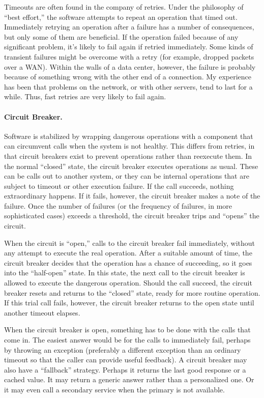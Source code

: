 Timeouts are often found in the company of retries. Under the philosophy of “best effort,” the software attempts to repeat an operation that timed out. Immediately retrying an operation after a failure has a number of consequences, but only some of them are beneficial. If the operation failed because of any significant problem, it’s likely to fail again if retried immediately. Some kinds of transient failures might be overcome with a retry (for example, dropped packets over a WAN). Within the walls of a data center, however, the failure is probably because of something wrong with the other end of a connection. My experience has been that problems on the network, or with other servers, tend to last for a while. Thus, fast retries are very likely to fail again.


\paragraph{Circuit Breaker.} Software is stabilized by wrapping dangerous operations with a component that can circumvent calls when the system is not healthy. This differs from retries, in that circuit breakers exist to prevent operations rather than reexecute them. In the normal “closed” state, the circuit breaker executes operations as usual.
These can be calls out to another system, or they can be internal operations that are subject to timeout or other execution failure. If the call succeeds, nothing extraordinary happens. If it fails, however, the circuit breaker makes a note of the failure. Once the number of failures (or the frequency of failures, in more sophisticated cases) exceeds a threshold, the circuit breaker trips and “opens” the circuit.

When the circuit is “open,” calls to the circuit breaker fail immediately, without any attempt to execute the real operation. After a suitable amount of time, the circuit breaker decides that the operation has a chance of succeeding, so it goes into the “half-open” state. In this state, the next call to the circuit breaker is allowed to execute the dangerous operation. Should the call succeed, the circuit breaker resets and returns to the “closed” state, ready for more routine operation. If this trial call fails, however, the circuit breaker returns to the open state until another timeout elapses.

When the circuit breaker is open, something has to be done with the calls that come in. The easiest answer would be for the calls to immediately fail, perhaps by throwing an exception (preferably a different exception than an ordinary timeout so that the caller can provide useful feedback). A circuit breaker may also have a “fallback” strategy. Perhaps it returns the last good response or a cached value. It may return a generic answer rather than a personalized one. Or it may even call a secondary service when the primary is not available.


